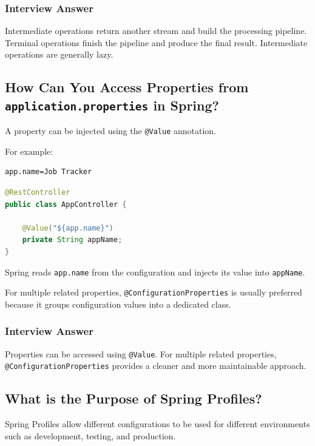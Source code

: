 \documentclass[12pt,a4paper]{article}
\begin{document}
\subsubsection*{Interview Answer}

Intermediate operations return another stream and build the processing
pipeline. Terminal operations finish the pipeline and produce the final
result. Intermediate operations are generally lazy.

\subsection{How Can You Access Properties from \texttt{application.properties} in Spring?}

A property can be injected using the \texttt{@Value} annotation.

For example:

\begin{verbatim}
app.name=Job Tracker
\end{verbatim}

\begin{lstlisting}[language=Java]
@RestController
public class AppController {

    @Value("${app.name}")
    private String appName;
}
\end{lstlisting}

Spring reads \texttt{app.name} from the configuration and injects its value
into \texttt{appName}.

For multiple related properties, \texttt{@ConfigurationProperties} is
usually preferred because it groups configuration values into a dedicated
class.

\subsubsection*{Interview Answer}

Properties can be accessed using \texttt{@Value}. For multiple related
properties, \texttt{@ConfigurationProperties} provides a cleaner and more
maintainable approach.

\subsection{What is the Purpose of Spring Profiles?}

Spring Profiles allow different configurations to be used for different
environments such as development, testing, and production.
\end{document}

